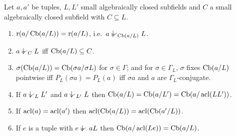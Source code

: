 \begin{proposition}\label{prop:cb}
Let $a,a'$ be tuples, $L,L'$ small algebraically closed subfields and $C$ a small
algebraically closed subfield with $C\subseteq L$.
\begin{enumerate}[label=\textup{(Cb\arabic*)}]
\item\label{Cb:ind} $\operatorname{r}(a/\operatorname{Cb}(a/L))=\operatorname{r}(a/L)$, i.e.\ $a\ind{\Cb(a/L)}L$.
\item\label{Cb:char} $a\ind{C}L$ iff $\operatorname{Cb}(a/L)\subseteq C$.
\item\label{Cb:equiv} $\sigma(\operatorname{Cb}(a/L))=\operatorname{Cb}(\sigma a/\sigma L)$ for $\sigma\in\Gamma$; and for
  $\sigma\in\Gamma_L$, $\sigma$ fixes $\operatorname{Cb}(a/L)$ pointwise iff $P_L(\sigma a)=P_L(a)$ iff
  $\sigma a$ and $a$ are $\Gamma_L$-conjugate.
\item\label{Cb:two} If $a\ind{L}L'$ and $a\ind{L'}L$ then $\operatorname{Cb}(a/L)=\operatorname{Cb}(a/L')=\operatorname{Cb}(a/\operatorname{acl}(LL'))$.
\item\label{Cb:interalg} If $\operatorname{acl}(a)=\operatorname{acl}(a')$ then $\operatorname{acl}(\operatorname{Cb}(a/L))=\operatorname{acl}(\operatorname{Cb}(a'/L))$.
\item\label{Cb:basechange} If $e$ is a tuple with $e\ind{}aL$ then
  $\operatorname{Cb}(a/\operatorname{acl}(Le))=\operatorname{Cb}(a/L)$.
\end{enumerate}
\end{proposition}
